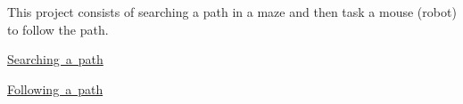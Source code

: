 This project consists of searching a path in a maze and then task a mouse (robot) to follow the path.
\begin{DoxyItemize}
\item \mbox{\hyperlink{searchingPathPage}{Searching a path}}
\item \mbox{\hyperlink{followingPathPage}{Following a path}} 
\end{DoxyItemize}